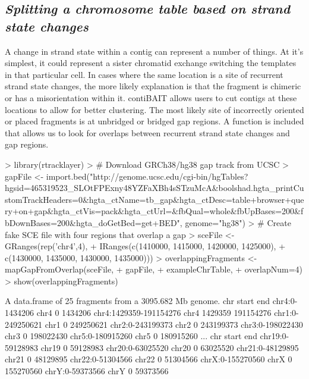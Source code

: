 \documentclass{article}
\begin{document}
\subsection{\textit{Splitting a chromosome table based on strand state changes}}
A change in strand state within a contig can represent a number of things. At it's simplest, it could represent a sister chromatid exchange switching the templates in that particular cell. In cases where the same location is a site of recurrent strand state changes, the more likely explanation is that the fragment is chimeric or has a misorientation within it. contiBAIT allows users to cut contigs at these locations to allow for better clustering. The most likely site of incorrectly oriented or placed fragments is at unbridged or bridged gap regions. A function is included that allows us to look for overlaps between recurrent strand state changes and gap regions.

\begin{Schunk}
\begin{Sinput}
> library(rtracklayer)
> # Download GRCh38/hg38 gap track from UCSC
> gapFile <- import.bed("http://genome.ucsc.edu/cgi-bin/hgTables?hgsid=465319523_SLOtFPExny48YZFaXBh4sSTzuMcA&boolshad.hgta_printCustomTrackHeaders=0&hgta_ctName=tb_gap&hgta_ctDesc=table+browser+query+on+gap&hgta_ctVis=pack&hgta_ctUrl=&fbQual=whole&fbUpBases=200&fbDownBases=200&hgta_doGetBed=get+BED", genome="hg38")
> # Create fake SCE file with four regions that overlap a gap
> sceFile <- GRanges(rep('chr4',4), 
+ IRanges(c(1410000, 1415000, 1420000, 1425000), 
+ c(1430000, 1435000, 1430000, 1435000)))
> overlappingFragments <- mapGapFromOverlap(sceFile,
+  gapFile, 
+  exampleChrTable, 
+  overlapNum=4)
> show(overlappingFragments)
\end{Sinput}
\begin{Soutput}
A data.frame of 25 fragments from a 3095.682 Mb genome.
                        chr   start       end
chr4:0-1434206         chr4       0   1434206
chr4:1429359-191154276 chr4 1429359 191154276
chr1:0-249250621       chr1       0 249250621
chr2:0-243199373       chr2       0 243199373
chr3:0-198022430       chr3       0 198022430
chr5:0-180915260       chr5       0 180915260
...
                   chr start       end
chr19:0-59128983 chr19     0  59128983
chr20:0-63025520 chr20     0  63025520
chr21:0-48129895 chr21     0  48129895
chr22:0-51304566 chr22     0  51304566
chrX:0-155270560  chrX     0 155270560
chrY:0-59373566   chrY     0  59373566
\end{Soutput}
\end{Schunk}
\end{document}
